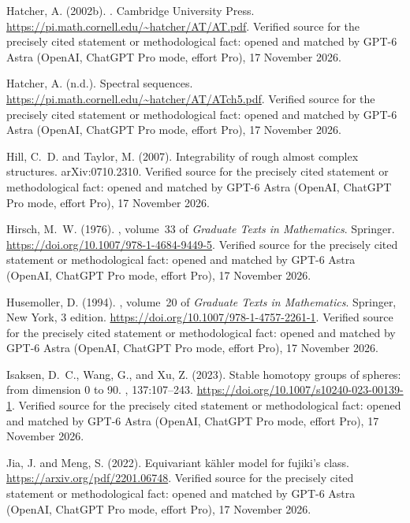 \begin{thebibliography}{}
Hatcher, A. (2002b).
.
\newblock Cambridge University Press.
\newblock \url{https://pi.math.cornell.edu/~hatcher/AT/AT.pdf}. Verified source for the precisely cited statement or methodological fact: opened and matched by GPT-6 Astra (OpenAI, ChatGPT Pro mode, effort Pro), 17 November 2026.

Hatcher, A. (n.d.).
\newblock Spectral sequences.
\newblock \url{https://pi.math.cornell.edu/~hatcher/AT/ATch5.pdf}. Verified source for the precisely cited statement or methodological fact: opened and matched by GPT-6 Astra (OpenAI, ChatGPT Pro mode, effort Pro), 17 November 2026.

Hill, C.~D. and Taylor, M. (2007).
\newblock Integrability of rough almost complex structures.
\newblock arXiv:0710.2310. Verified source for the precisely cited statement or methodological fact: opened and matched by GPT-6 Astra (OpenAI, ChatGPT Pro mode, effort Pro), 17 November 2026.

Hirsch, M.~W. (1976).
, volume~33 of {\em Graduate Texts in
  Mathematics}.
\newblock Springer.
\newblock \url{https://doi.org/10.1007/978-1-4684-9449-5}. Verified source for the precisely cited statement or methodological fact: opened and matched by GPT-6 Astra (OpenAI, ChatGPT Pro mode, effort Pro), 17 November 2026.

Husemoller, D. (1994).
, volume~20 of {\em Graduate Texts in
  Mathematics}.
\newblock Springer, New York, 3 edition.
\newblock \url{https://doi.org/10.1007/978-1-4757-2261-1}. Verified source for the precisely cited statement or methodological fact: opened and matched by GPT-6 Astra (OpenAI, ChatGPT Pro mode, effort Pro), 17 November 2026.

Isaksen, D.~C., Wang, G., and Xu, Z. (2023).
\newblock Stable homotopy groups of spheres: from dimension 0 to 90.
, 137:107--243.
\newblock \url{https://doi.org/10.1007/s10240-023-00139-1}. Verified source for the precisely cited statement or methodological fact: opened and matched by GPT-6 Astra (OpenAI, ChatGPT Pro mode, effort Pro), 17 November 2026.

Jia, J. and Meng, S. (2022).
\newblock Equivariant k{\"a}hler model for fujiki's class.
\newblock \url{https://arxiv.org/pdf/2201.06748}. Verified source for the precisely cited statement or methodological fact: opened and matched by GPT-6 Astra (OpenAI, ChatGPT Pro mode, effort Pro), 17 November 2026.


\end{thebibliography}
